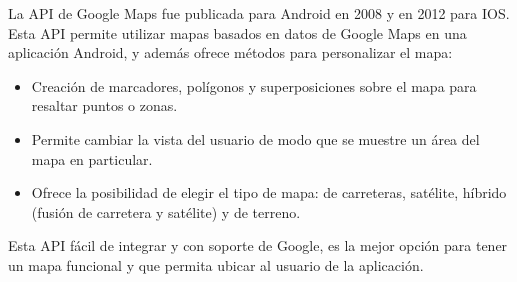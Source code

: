La API de Google Maps \cite{URL::GoogleMapsApi} fue publicada para Android en 2008 y en 2012 para IOS. Esta API permite utilizar mapas basados en datos de Google Maps en una aplicación Android, y además ofrece métodos para personalizar el mapa:
\begin{itemize}
    \item Creación de marcadores, polígonos y superposiciones sobre el mapa para resaltar puntos o zonas. 
    \item Permite cambiar la vista del usuario de modo que se muestre un área del mapa en particular. 
    \item Ofrece la posibilidad de elegir el tipo de mapa: de carreteras, satélite, híbrido (fusión de carretera y satélite) y de terreno.
\end{itemize}

Esta API fácil de integrar y con soporte de Google, es la mejor opción para tener un mapa funcional y que permita ubicar al usuario de la aplicación.
